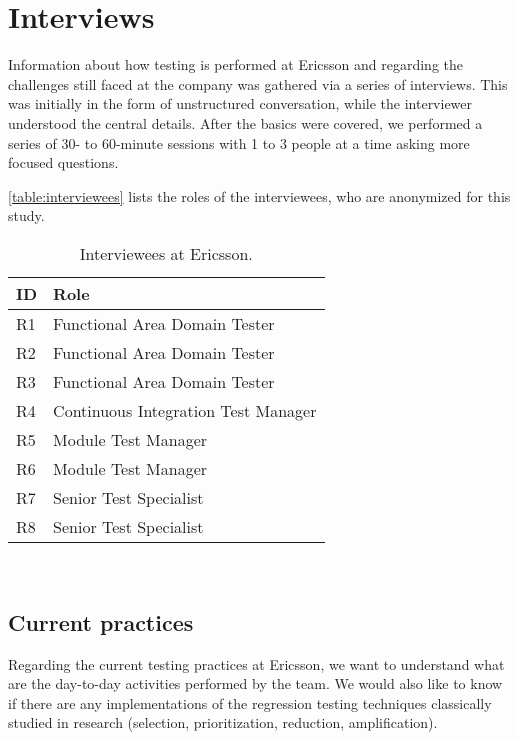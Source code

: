 \section{Interviews}
\label{sec:ind_interviews}


Information about how testing is performed at Ericsson and regarding the challenges still faced at the company was gathered via a series of interviews.
This was initially in the form of unstructured conversation, while the interviewer understood the central details.
After the basics were covered, we performed a series of 30- to 60-minute sessions with 1 to 3 people at a time asking more focused questions.

\autoref{table:interviewees} lists the roles of the interviewees, who are anonymized for this study.

\begin{table}[]
\centering
{}
\begin{tabular}{ll}
\toprule
\textbf{ID} & \textbf{Role} \\
\midrule
R1 & Functional Area Domain Tester \\
R2 & Functional Area Domain Tester \\
R3 & Functional Area Domain Tester \\
R4 & Continuous Integration Test Manager \\
R5 & Module Test Manager \\
R6 & Module Test Manager \\
R7 & Senior Test Specialist \\
R8 & Senior Test Specialist \\
\bottomrule
\end{tabular}\\
\caption{Interviewees at Ericsson.}
\label{table:interviewees}
\end{table}

\subsection{Current practices}

Regarding the current testing practices at Ericsson, we want to understand what are the day-to-day activities performed by the team.
We would also like to know if there are any implementations of the regression testing techniques classically studied in research (selection, prioritization, reduction, amplification).

